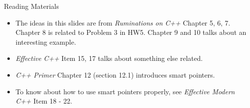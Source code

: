 \documentclass{beamer}
\begin{document}
\begin{frame}{Reading Materials}
    \begin{itemize}
        \item The ideas in this slides are from \textit{Ruminations on C++} Chapter 5, 6, 7. Chapter 8 is related to Problem 3 in HW5. Chapter 9 and 10 talks about an interesting example.
        \item \textit{Effective C++} Item 15, 17 talks about something else related.
        \item \textit{C++ Primer} Chapter 12 (section 12.1) introduces smart pointers.
        \item To know about how to use smart pointers properly, see \textit{Effective Modern C++} Item 18 - 22.
    \end{itemize}
\end{frame}
\end{document}
